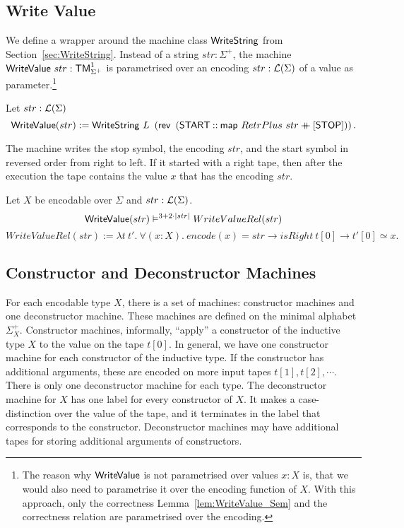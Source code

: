 \subsection{Write Value}
\label{sec:WriteValue}
%

We define a wrapper around the machine class $\mathsf{WriteString}$ from Section~\ref{sec:WriteString}.  Instead of a string $str : \Sigma^+$, the machine
$\mathsf{WriteValue}~str : \mathsf{TM}_{\Sigma^+}^1$ is parametrised over an encoding $str:\mathcal{L}(\Sigma)$ of a value as parameter.\footnote{The reason why
  $\MS{WriteValue}$ is not parametrised over values $x:X$ is, that we would also need to parametrise it over the encoding function of $X$.  With this
  approach, only the correctness Lemma~\ref{lem:WriteValue_Sem} and the correctness relation are parametrised over the encoding.}
\begin{definition}[$\MS{WriteValue}$][WriteValue]
  \label{def:WriteValue}
  Let $str:\mathcal{L}(\Sigma)$
  \[
    \mathsf{WriteValue}(str) := \mathsf{WriteString}~L~\left(\mathsf{rev}~\left(\mathsf{START} \mathbin{::} \mathsf{map}~RetrPlus~str \mathbin{+\mkern-10mu+} [\mathsf{STOP}]\right)\right).
  \]
\end{definition}
The machine writes the stop symbol, the encoding $str$, and the start symbol in reversed order from right to left.  If it started with a right tape,
then after the execution the tape contains the value $x$ that has the encoding $str$.
\begin{lemma}
  \label{lem:WriteValue_Sem}
  Let $X$ be encodable over $\Sigma$ and $str : \mathcal{L}(\Sigma)$.
  \[
    \mathsf{WriteValue}(str) \mathrel{\vDash^{3 + 2 \cdot \left| str \right|}} WriteValueRel(str)
  \]
  \[
    WriteValueRel(str) := \lambda t~t'.~\forall (x:X).~encode(x) = str \rightarrow isRight~t[0] \rightarrow t'[0] \simeq x.
  \]
\end{lemma}


\subsection{Constructor and Deconstructor Machines}
\label{sec:constructors-deconstructors}


For each encodable type $X$, there is a set of machines: constructor machines and one deconstructor machine.  These machines are defined on the
minimal alphabet $\Sigma_X^+$.  Constructor machines, informally, ``apply'' a constructor of the inductive type $X$ to the value on the tape $t[0]$.
In general, we have one constructor machine for each constructor of the inductive type.  If the constructor has additional arguments, these are
encoded on more input tapes $t[1], t[2], \cdots$.  There is only one deconstructor machine for each type.  The deconstructor machine for $X$ has one
label for every constructor of $X$.  It makes a case-distinction over the value of the tape, and it terminates in the label that corresponds to the
constructor.  Deconstructor machines may have additional tapes for storing additional arguments of constructors.

